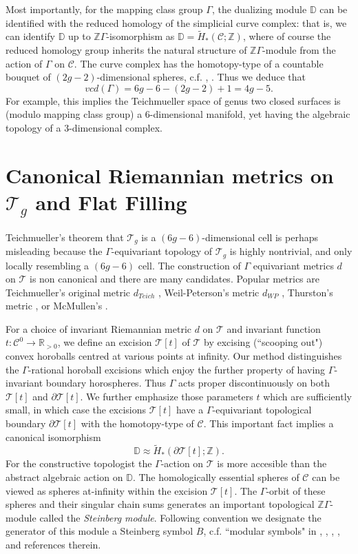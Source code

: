 \documentclass[12pt]{amsart}
\theoremstyle{definition}
\theoremstyle{remark}
\newcommand{\bR}{\mathbb{R}}
\newcommand{\bZ}{\mathbb{Z}}
\newcommand{\del}{\partial}
\newcommand{\bD}{\mathbb{D}}
\newcommand{\sC}{\mathscr{C}}
\newcommand{\sT}{\mathscr{T}}
\begin{document}
Most importantly, for the mapping class group $\Gamma$, the dualizing module $\bD$ can be identified with the reduced homology of the simplicial curve complex: that is, we can identify $\bD$ up to $\bZ\Gamma$-isomorphism as $\bD=\tilde{H}_*(\sC;\bZ)$, where of course the reduced homology group inherits the natural structure of $\bZ \Gamma$-module from the action of $\Gamma$ on $\sC$. The curve complex has the homotopy-type of a countable bouquet of $(2g-2)$-dimensional spheres, c.f. \cite{ivanov2015virtual}, \cite{Harer1986}. Thus we deduce that $$vcd(\Gamma)=6g-6-(2g-2)+1=4g-5.$$ For example, this implies the Teichmueller space of genus two closed surfaces is (modulo mapping class group) a $6$-dimensional manifold, yet having the algebraic topology of a $3$-dimensional complex.  


\section{Canonical Riemannian metrics on $\sT_g$ and Flat Filling}\label{s2}

Teichmueller's theorem that $\sT_g$ is a $(6g-6)$-dimensional cell is perhaps misleading because the $\Gamma$-equivariant topology of $\sT_g$ is highly nontrivial, and only locally resembling a $(6g-6)$ cell. The construction of $\Gamma$ equivariant metrics $d$ on $\sT$ is non canonical and there are many candidates. Popular metrics are Teichmueller's original metric $d_{Teich}$ \cite{hubbard},  Weil-Peterson's metric $d_{WP}$ \cite{hubbard}, Thurston's metric \cite{wolpert1986a}, or McMullen's \cite{mcmullen2000moduli}. 

For a choice of invariant Riemannian metric $d$ on $\sT$ and invariant function $t: \sC^0 \to \bR_{>0}$, we define an excision $\sT[t]$ of $\sT$ by excising (``scooping out") convex horoballs centred at various points at infinity. Our method distinguishes the $\Gamma$-rational horoball excisions which enjoy the further property of having $\Gamma$-invariant boundary horospheres. Thus $\Gamma$ acts proper discontinuously on both $\sT[t]$ and $\del \sT[t]$. We further emphasize those parameters $t$ which are sufficiently small, in which case the excisions $\sT[t]$  have a $\Gamma$-equivariant topological boundary $\del \sT[t]$ with the homotopy-type of $\sC$. This important fact implies a canonical isomorphism $$\bD\approx \tilde{H}_*(\del \sT[t]; \bZ).$$ For the constructive topologist the $\Gamma$-action on $\sT$ is more accesible than the abstract algebraic action on $\bD$. The homologically essential spheres of $\sC$ can be viewed as spheres at-infinity within the excision $\sT[t]$. The $\Gamma$-orbit of these spheres and their singular chain sums generates an important topological $\bZ \Gamma$-module called the \emph{Steinberg module}. Following convention we designate the generator of this module a Steinberg symbol $B$, c.f. ``modular symbols" in \cite{AR}, \cite{AGM}, \cite{Stein}, \cite{Sol}, and references therein. 
\end{document}
